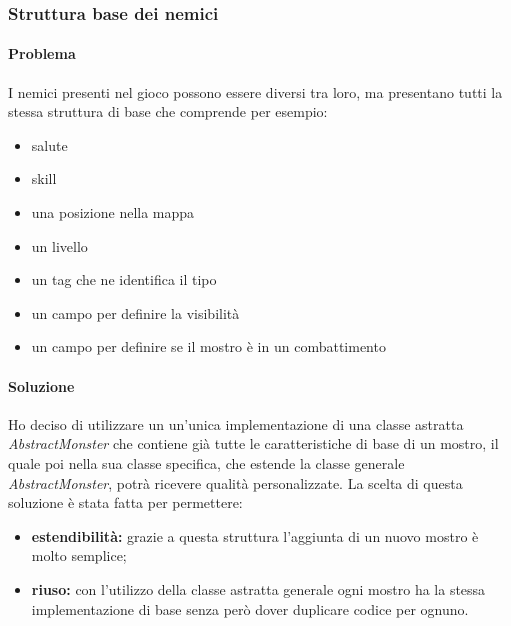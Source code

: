 \documentclass{report}
\begin{document}
\subsubsection{Struttura base dei nemici}

\paragraph{Problema} I nemici presenti nel gioco possono essere diversi tra loro, ma presentano tutti la stessa struttura di base che comprende per esempio:

\begin{itemize}
    \item salute
    \item skill
    \item una posizione nella mappa
    \item un livello
    \item un tag che ne identifica il tipo
    \item un campo per definire la visibilità
    \item un campo per definire se il mostro è in un combattimento
\end{itemize}

\paragraph{Soluzione} Ho deciso di utilizzare un un'unica implementazione di una classe astratta \textit{AbstractMonster} che contiene già tutte le caratteristiche di base di un mostro, il quale poi nella sua classe
%
specifica, che estende la classe generale \textit{AbstractMonster}, potrà ricevere qualità personalizzate. La scelta di questa soluzione è stata fatta per permettere:

\begin{itemize}
    \item \textbf{estendibilità:} grazie a questa struttura l'aggiunta di un nuovo mostro è molto semplice;
    \item \textbf{riuso:} con l'utilizzo della classe astratta generale ogni mostro ha la stessa implementazione di base senza però dover duplicare codice per ognuno.
\end{itemize}
\end{document}
